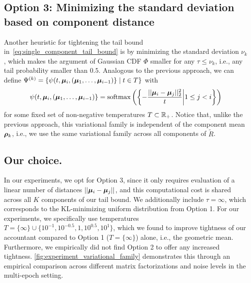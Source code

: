 \subsection{Option 3: Minimizing the standard deviation based on component distance}
Another heuristic for tightening the tail bound in~\cref{eq:single_component_tail_bound}
is by minimizing the standard deviation $\nu_k$, which makes the argument of Gaussian CDF $\Phi$ smaller for any $\tau \leq \nu_k$, i.e., any tail probability smaller than $0.5$.
Analogous to the previous approach, we can define
$\Psi^{(k)} = \{\psi(t, {\bm{\mu}}_i, ({\bm{\mu}}_1,\dots,{\bm{\mu}}_{i-1})\} \mid t \in T\}$ with
\begin{equation*}
    \psi(t, {\bm{\mu}}_i, ({\bm{\mu}}_1,\dots,{\bm{\mu}}_{i-1})\}
    = \mathrm{softmax}\left( \left\{- \frac{||{\bm{\mu}}_i - {\bm{\mu}}_j||_2^2}{t } \middle| 1 \leq j < i\right\} \right)
\end{equation*}
for some fixed set of non-negative temperatures $T \subset {\mathbb{R}}_+$.
Notice that, unlike the previous approach, this variational family is independent of the component mean ${\bm{\rho}}_k$, i.e.,
we use the same variational family across all components of $\tilde{R}$.

\subsection{Our choice.}
In our experiments, we opt for Option 3, since it only requires evaluation of a linear number of distances $||{\bm{\mu}}_i - {\bm{\mu}}_j||$,
and this computational cost is shared across all $K$ components of our tail bound.
We additionally include $\tau = \infty$, which corresponds to the KL-minimizing uniform distribution from Option 1.
For our experiments, we specifically use temperatures $T = \{\infty\} \cup \{10^{-1}, 10^{-0.5}, 1, 10^{0.5}, 10^{1}\}$, which we found to improve tightness of our accountant compared to Option 1 ($T = \{\infty\}$) alone, i.e., the geometric mean.
Furthermore, we empirically did not find Option 2 to offer any increased tightness.
\cref{fig:experiment_variational_family} demonstrates this through an empirical comparison across different matrix factorizations and noise levels in the multi-epoch setting.

